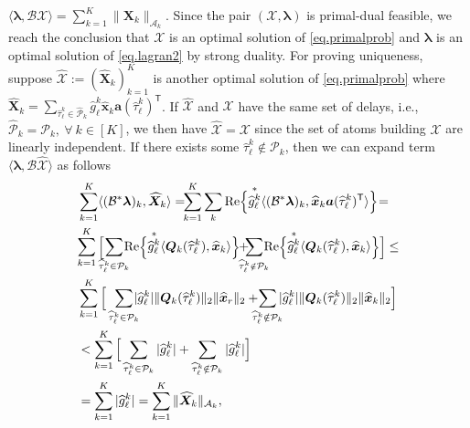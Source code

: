 \documentclass[conference,10pt]{IEEEtran}
\theoremstyle{remark}
\theoremstyle{plain}
\theoremstyle{definition}
\theoremstyle{remark}
\begin{document}
$\langle \bm{\lambda}, \mathcal{B}\bm{\mathcal{X}}\rangle=\sum_{k=1}^K\|\bm{X}_k\|_{\mathcal{A}_k}$. Since the pair $(\bm{\mathcal{X}}, \bm{\lambda})$ is primal-dual feasible, we reach the conclusion that $\bm{\mathcal{X}}$ is an optimal solution of \eqref{eq.primalprob} and $\bm{\lambda}$ is an optimal solution of \eqref{eq.lagran2} by strong duality. For proving uniqueness, suppose $\widehat{\bm{\mathcal{X}}}:=(\widehat{\bm{X}}_k)_{k=1}^K$ is another optimal solution of \eqref{eq.primalprob} where $\widehat{\bm{X}}_k=\sum_{\widehat{\tau}_{\ell}^k\in \widehat{\mathcal{P}}_k}\widehat{g}_{\ell}^k\widehat{\bm{x}}_k\bm{a}(\widehat{\tau}_{\ell}^k)^{\mathsf{T}}$. If $\widehat{\bm{\mathcal{X}}}$ and $\bm{\mathcal{X}}$ have the same set of delays, i.e., $\widehat{\mathcal{P}}_k=\mathcal{P}_k,~\forall~k \in [K]$, we then have $\widehat{\bm{\mathcal{X}}}=\bm{\mathcal{X}}$ since the set of atoms building $\bm{\mathcal{X}}$ are linearly independent. If there exists some $\widehat{\tau}_{\ell}^k\notin \mathcal{P}_k$, then we can expand term $\langle \bm{\lambda}, \mathcal{B}\widehat{\bm{\mathcal{X}}}\rangle$ as follows 
\begin{align}\label{eq.rel3}
&\sum_{k=1}^K\langle (\mathcal{B}^*\bm{\lambda})_k, \widehat{\bm{X}}_k\rangle=\hspace{-4pt}
\sum_{k=1}^K \sum_{k}{\rm Re}\Big\{{\overset{*}{\widehat{g}_{\ell}^k}}\langle (\mathcal{B}^*\bm{\lambda})_k, \widehat{\bm{x}}_k\bm{a}(\widehat{\tau}_{\ell}^k)^{\mathsf{T}} \rangle\Big\}\hspace{-2pt}=\nonumber\\
&	{\footnotesize \sum_{k=1}^K\Big[\hspace{-6pt}\sum_{\widehat{\tau}_{\ell}^k\in \mathcal{P}_k}\hspace{-6pt}{\rm Re}\Big\{{\overset{*}{\widehat{g}_{\ell}^k}}
\langle\bm{Q}_k(\widehat{\tau}_{\ell}^k),\widehat{\bm{x}}_k \rangle\Big\}\hspace{-3pt}+\hspace{-10pt}\sum_{\widehat{\tau}_{\ell}^k\notin \mathcal{P}_k}\hspace{-6pt}{\rm Re}\Big\{{\overset{*}{\widehat{g}_{\ell}^k}}
\langle\bm{Q}_k(\widehat{\tau}_{\ell}^k),\widehat{\bm{x}}_k \rangle\Big\}\Big]\le}\nonumber\\
&\sum_{k=1}^K\Big[\sum_{\widehat{\tau}_{\ell}^k\in \mathcal{P}_k}\hspace{-6pt}|\widehat{g}_{\ell}^k|
\|\bm{Q}_k(\widehat{\tau}_{\ell}^k)\|_2\|\widehat{\bm{x}}_r\|_2 +\hspace{-7pt}\sum_{\widehat{\tau}_{\ell}^k\notin \mathcal{P}_k}\hspace{-5pt}|\widehat{g}_{\ell}^k|
\|\bm{Q}_k(\widehat{\tau}_{\ell}^k)\|_2\|\widehat{\bm{x}}_k\|_2\Big]\nonumber\\ \nonumber
&<\sum_{k=1}^K\Big[\sum_{\widehat{\tau}_{\ell}^k\in \mathcal{P}_k}|\widehat{g}_{\ell}^k|
 +\sum_{\widehat{\tau}_{\ell}^k\notin \mathcal{P}_k}|\widehat{g}_{\ell}^k|\Big]\\
 & =\sum_{k=1}^K|\widehat{g}_{\ell}^k|=\sum_{k=1}^K\|\widehat{\bm{X}}_k\|_{\mathcal{A}_k},
\end{align}
\end{document}
